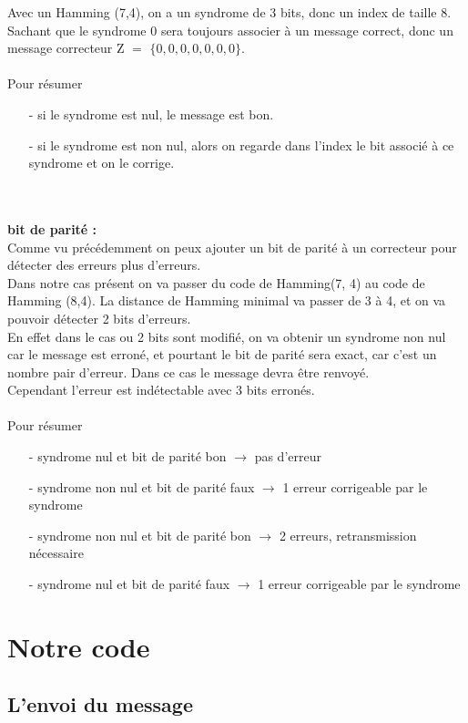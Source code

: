 Avec un Hamming (7,4), on a un syndrome de 3 bits, donc un index de taille 8. Sachant que le syndrome 0 sera toujours associer à un message correct, donc un message correcteur    Z $=$ $\{0,0,0,0,0,0,0\}$. \\
\\
Pour résumer
\begin{enumerate}
  \item[-] si le syndrome est nul, le message est bon.
  \item[-] si le syndrome est non nul, alors on regarde dans l’index le bit associé à ce syndrome et on le corrige.
\end{enumerate}
\\
\\ \textbf{bit de parité :}
\\
Comme vu précédemment on peux ajouter un bit de parité à un correcteur pour détecter des erreurs plus d’erreurs.\\
Dans notre cas présent on va passer du code de Hamming(7, 4) au code de Hamming (8,4). La distance de Hamming minimal va passer de 3 à 4, et on va pouvoir détecter 2 bits d’erreurs. \\
En effet dans le cas ou 2 bits sont modifié, on va obtenir un syndrome non nul car le message est erroné, et pourtant le bit de parité sera exact, car c’est un nombre pair d’erreur. Dans ce cas le message devra être renvoyé.\\
Cependant l’erreur est indétectable avec 3 bits erronés.\\
\\
Pour résumer
\begin{enumerate}
  \item[-] syndrome nul et bit de parité bon $\rightarrow$ pas d’erreur
  \item[-] syndrome non nul et bit de parité faux $\rightarrow$  1 erreur corrigeable par le syndrome
  \item[-] syndrome non nul et bit de parité bon $\rightarrow$ 2 erreurs, retransmission nécessaire
  \item[-] syndrome nul et bit de parité faux $\rightarrow$ 1 erreur corrigeable par le syndrome
\end{enumerate}
\newpage

\section{Notre code}
\label{sec:Notre code}

\subsection{L'envoi du message}
\label{sub:L'envoi du message}

